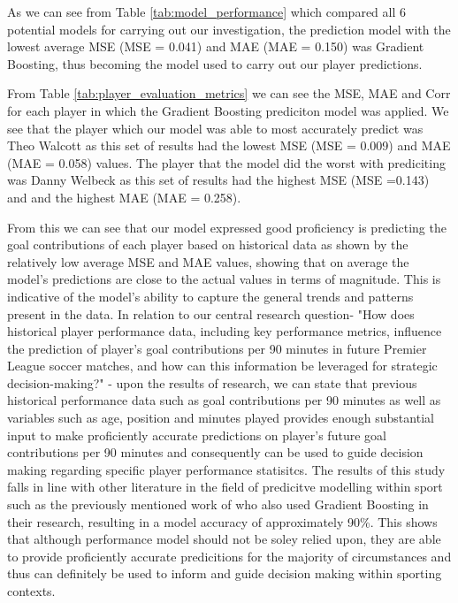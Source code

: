 \documentclass[12pt]{article}
\begin{document}
As we can see from Table \ref{tab:model_performance} which compared all 6
potential models for carrying out our investigation, the prediction model with
the lowest average MSE (MSE = 0.041) and MAE (MAE = 0.150) was Gradient Boosting,
thus becoming the model used to carry out our player predictions.

From Table \ref{tab:player_evaluation_metrics} we can see the MSE, MAE and Corr 
for each player in which the Gradient Boosting prediciton model was applied.
We see that the player which our model was able to most accurately predict was 
Theo Walcott as this set of results had the lowest MSE (MSE = 0.009) and MAE
(MAE = 0.058) values. The player that the model did the worst with prediciting
was Danny Welbeck as this set of results had the highest MSE (MSE =0.143) and 
and the highest MAE (MAE = 0.258).

From this we can see that our model expressed good proficiency is predicting 
the goal contributions of each player based on historical data as shown by the 
relatively low average MSE and MAE values, showing that on average the  model's
predictions are close to the actual values in terms of magnitude. This  is
indicative of the model's ability to capture the general trends and patterns
present in the data. 
In relation to our central research question- "How does historical player
performance data, including key performance metrics, influence the prediction of
player's goal contributions per 90 minutes in future Premier League soccer matches,
and how can this information be leveraged for strategic decision-making?" - upon
the results of research, we can state that previous historical performance data 
such as goal contributions per 90 minutes as well as variables such as age, 
position and minutes played provides enough substantial input to make proficiently 
accurate predictions on player's future goal contributions per 90 minutes and 
consequently can be used to guide decision making regarding specific player 
performance statisitcs.
The results of this study falls in line with other literature in the field of 
predicitve modelling within sport such as the previously mentioned work of 
\citet{geurkink2021machine} who also used Gradient Boosting in their research,
resulting in a model accuracy of approximately 90\%. This shows that although 
performance model should not be soley relied upon, they  are able to provide
proficiently accurate predicitions for the majority of circumstances and thus can
definitely be used to inform and guide decision making within sporting contexts.
\end{document}
